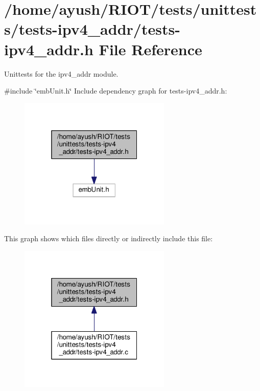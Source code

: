 \hypertarget{tests-ipv4__addr_8h}{}\section{/home/ayush/\+R\+I\+O\+T/tests/unittests/tests-\/ipv4\+\_\+addr/tests-\/ipv4\+\_\+addr.h File Reference}
\label{tests-ipv4__addr_8h}


Unittests for the {\ttfamily ipv4\+\_\+addr} module.  


{\ttfamily \#include \char`\"{}emb\+Unit.\+h\char`\"{}}\newline
Include dependency graph for tests-\/ipv4\+\_\+addr.h\+:
\nopagebreak
\begin{figure}[H]
\begin{center}
\leavevmode
\includegraphics[width=205pt]{tests-ipv4__addr_8h__incl}
\end{center}
\end{figure}
This graph shows which files directly or indirectly include this file\+:
\nopagebreak
\begin{figure}[H]
\begin{center}
\leavevmode
\includegraphics[width=205pt]{tests-ipv4__addr_8h__dep__incl}
\end{center}
\end{figure}
